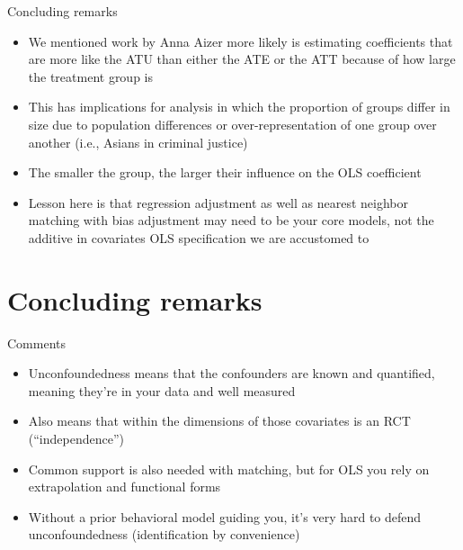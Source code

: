 \documentclass{beamer}
\begin{document}
\begin{frame}{Concluding remarks}

\begin{itemize}

\item We mentioned work by Anna Aizer more likely is estimating coefficients that are more like the ATU than either the ATE or the  ATT because of how large the treatment group is
\item This has implications for analysis in which the proportion of groups differ in size due to population differences or over-representation of one group over another (i.e., Asians in criminal justice)
\item The smaller the group, the larger their influence on the OLS coefficient
\item Lesson here is that regression adjustment as well as nearest neighbor matching with bias adjustment may need to be your core models, not the additive in covariates OLS specification we are accustomed to

\end{itemize}

\end{frame}




\section{Concluding remarks}




\begin{frame}{Comments}


\begin{itemize}

\item Unconfoundedness means that the confounders are known and quantified, meaning they're in your data and well measured
\item Also means that within the dimensions of those covariates is an RCT (``independence'')
\item Common support is also needed with matching, but for OLS you rely on extrapolation and functional forms
\item Without a prior behavioral model guiding you, it's very hard to defend unconfoundedness (identification by convenience) 

\end{itemize}

\end{frame}
\end{document}

